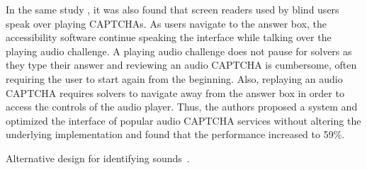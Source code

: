 In the same study \cite{bigham2009evaluating}, it was also found that screen readers used by blind users speak over
playing CAPTCHAs. As users navigate to the answer box, the accessibility software continue speaking the interface while
talking over the playing audio challenge. A playing audio challenge does not pause for solvers as they type their answer
and reviewing an audio CAPTCHA is cumbersome, often requiring the user to start again from the beginning. Also, replaying
an audio CAPTCHA requires solvers to navigate away from the answer box in order to access the controls of the audio player.
Thus, the authors proposed a system and optimized the interface of popular audio CAPTCHA services without altering the
underlying implementation and found that the performance increased to 59\%. 

Alternative design for identifying sounds~\cite{Lazar:2012}.


